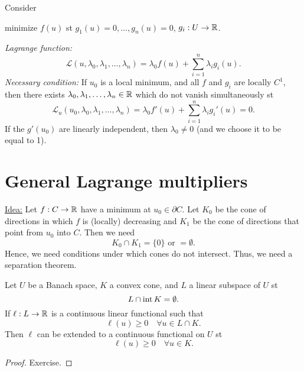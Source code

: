 \documentclass[../skript.tex]{subfiles}
\begin{document}
\begin{example} %
Consider
\label{ex:c1e33}
\begin{problemnonumb}
minimize $f(u)$ \ac{st} $g_1(u) = 0, \ldots, g_n(u) = 0$, $g_i : U \to \mathbb{R}$.
\end{problemnonumb}
\emph{Lagrange function:}
\[
	\mathcal{L}(u, \lambda_0, \lambda_1, \ldots, \lambda_n) = \lambda_0 f(u) + \sum_{i=1}^n \lambda_i g_i(u).
\]
\emph{Necessary condition:}
If $u_0$ is a local minimum, and all $f$ and $g_i$ are locally $C^1$, then there exists $\lambda_0, \lambda_1, \ldots, \lambda_n \in \mathbb{R}$ which do not vanish simultaneously \ac{st}
\[
	\mathcal{L}_u(u_0, \lambda_0, \lambda_1, \ldots, \lambda_n) = \lambda_0 f'(u) + \sum_{i=1}^n \lambda_i g_i'(u) = 0.
\]
If the $g'(u_0)$ are linearly independent, then $\lambda_0 \neq 0$ (and we choose it to be equal to 1).
\end{example}
\section{General Lagrange multipliers} %
\label{sec:c1e4}
\underline{Idea:} Let $f : C \to \mathbb{R}$ have a minimum at $u_0 \in \partial C$. Let $K_0$ be the cone of directions in which $f$ is (locally) decreasing and $K_1$ be the cone of directions that point from $u_0$ into $C$. Then we need
\[
	K_0 \cap K_1 = \{ 0 \} \text{ or } = \emptyset.
\]
Hence, we need conditions under which cones do not intersect. Thus, we need a separation theorem.
\begin{proposition} %
\label{prop:c1e34}
Let $U$ be a Banach space, $K$ a convex cone, and $L$ a linear subspace of $U$ \ac{st}
\[
	L \cap \operatorname{int} K = \emptyset.
\]
If $\ell : L \to \mathbb{R}$ is a continuous linear functional such that
\[
	\ell(u) \geq 0 \quad \forall u \in L \cap K.
\]
Then $\ell$ can be extended to a continuous functional on $U$ \ac{st}
\[
	\ell(u) \geq 0 \quad \forall u \in K.
\]
\end{proposition}
\begin{proof}
Exercise.
\end{proof}
\end{document}
